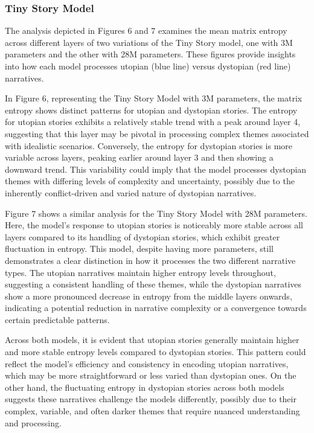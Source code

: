 \documentclass{article}
\begin{document}
\subsubsection{Tiny Story Model}

The analysis depicted in Figures 6 and 7 examines the mean matrix entropy across different layers of two variations of the Tiny Story model, one with 3M parameters and the other with 28M parameters. These figures provide insights into how each model processes utopian (blue line) versus dystopian (red line) narratives.

In Figure 6, representing the Tiny Story Model with 3M parameters, the matrix entropy shows distinct patterns for utopian and dystopian stories. The entropy for utopian stories exhibits a relatively stable trend with a peak around layer 4, suggesting that this layer may be pivotal in processing complex themes associated with idealistic scenarios. Conversely, the entropy for dystopian stories is more variable across layers, peaking earlier around layer 3 and then showing a downward trend. This variability could imply that the model processes dystopian themes with differing levels of complexity and uncertainty, possibly due to the inherently conflict-driven and varied nature of dystopian narratives.

Figure 7 shows a similar analysis for the Tiny Story Model with 28M parameters. Here, the model's response to utopian stories is noticeably more stable across all layers compared to its handling of dystopian stories, which exhibit greater fluctuation in entropy. This model, despite having more parameters, still demonstrates a clear distinction in how it processes the two different narrative types. The utopian narratives maintain higher entropy levels throughout, suggesting a consistent handling of these themes, while the dystopian narratives show a more pronounced decrease in entropy from the middle layers onwards, indicating a potential reduction in narrative complexity or a convergence towards certain predictable patterns.

Across both models, it is evident that utopian stories generally maintain higher and more stable entropy levels compared to dystopian stories. This pattern could reflect the model's efficiency and consistency in encoding utopian narratives, which may be more straightforward or less varied than dystopian ones. On the other hand, the fluctuating entropy in dystopian stories across both models suggests these narratives challenge the models differently, possibly due to their complex, variable, and often darker themes that require nuanced understanding and processing.
\end{document}
